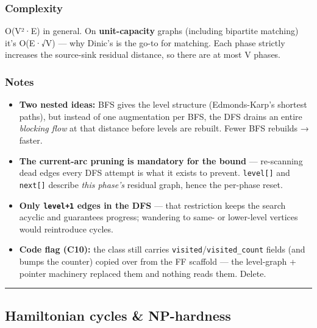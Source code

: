 \documentclass[
  10pt,
  letterpaper,
  onecolumn]{article}
\providecommand{\tightlist}{%
  \setlength{\itemsep}{0pt}\setlength{\parskip}{0pt}}
\begin{document}
\hypertarget{complexity-27}{%
\subsubsection{Complexity}\label{complexity-27}}

O(V²·E) in general. On \textbf{unit-capacity} graphs (including
bipartite matching) it's O(E·√V) --- why Dinic's is the go-to for
matching. Each phase strictly increases the source-sink residual
distance, so there are at most V phases.

\hypertarget{notes-26}{%
\subsubsection{Notes}\label{notes-26}}

\begin{itemize}
\tightlist
\item
  \textbf{Two nested ideas:} BFS gives the level structure
  (Edmonds-Karp's shortest paths), but instead of one augmentation per
  BFS, the DFS drains an entire \emph{blocking flow} at that distance
  before levels are rebuilt. Fewer BFS rebuilds → faster.
\item
  \textbf{The current-arc pruning is mandatory for the bound} ---
  re-scanning dead edges every DFS attempt is what it exists to prevent.
  \texttt{level{[}{]}} and \texttt{next{[}{]}} describe \emph{this
  phase's} residual graph, hence the per-phase reset.
\item
  \textbf{Only \texttt{level+1} edges in the DFS} --- that restriction
  keeps the search acyclic and guarantees progress; wandering to same-
  or lower-level vertices would reintroduce cycles.
\item
  \textbf{Code flag (C10):} the class still carries
  \texttt{visited}/\texttt{visited\_count} fields (and bumps the
  counter) copied over from the FF scaffold --- the level-graph +
  pointer machinery replaced them and nothing reads them. Delete.
\end{itemize}

\begin{center}\rule{0.5\linewidth}{0.5pt}\end{center}

\hypertarget{hamiltonian-cycles-np-hardness}{%
\subsection{Hamiltonian cycles \&
NP-hardness}\label{hamiltonian-cycles-np-hardness}}
\end{document}
